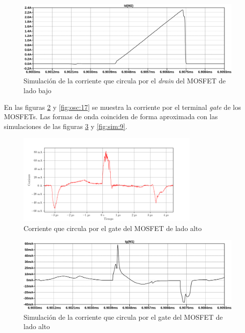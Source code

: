 \begin{figure}[H]
    \centering
    \includegraphics[width=\textwidth]{images/sim/11.pdf}
    \caption{Simulación de la corriente que circula por el \textit{drain} del MOSFET de lado bajo}
    \label{fig:sim:11}
\end{figure}

En las figuras \ref{fig:osc:15} y \ref{fig:osc:17} se muestra la corriente por el terminal \textit{gate} de los MOSFETs. Las formas de onda coinciden de forma aproximada con las simulaciones de las figuras \ref{fig:sim:8} y \ref{fig:sim:9}.

\begin{figure}[H]
    \centering
    \includegraphics[width=0.8\textwidth]{images/capturas-osciloscopio/17-11-2022/15.png}
    \caption{Corriente que circula por el gate del MOSFET de lado alto}
    \label{fig:osc:15}
\end{figure}
 
\begin{figure}[H]
    \centering
    \includegraphics[width=\textwidth]{images/sim/8.pdf}
    \caption{Simulación de la corriente que circula por el gate del MOSFET de lado alto}
    \label{fig:sim:8}
\end{figure}
 
